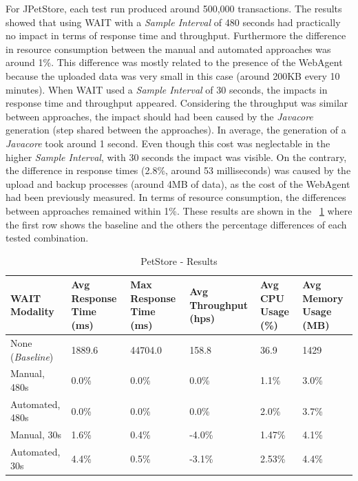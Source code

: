 \documentclass[runningheads,a4paper]{llncs}
\begin{document}
For JPetStore, each test run produced around 500,000 transactions. The
results showed that using WAIT with a \emph{Sample Interval} of 480 seconds had
practically no impact in terms of response time and throughput. Furthermore the
difference in resource consumption between the manual and automated approaches
was around 1\%.  This difference was mostly related to the presence of the
WebAgent because the uploaded data was very small in this case (around 200KB
every 10 minutes). When WAIT used a \emph{Sample Interval} of 30 seconds, the
impacts in response time and throughput appeared. Considering the throughput was
similar between approaches, the impact should had been caused by the
\emph{Javacore} generation (step shared between the approaches). In average, the
generation of a \emph{Javacore} took around 1 second. Even though this cost was
neglectable in the higher \emph{Sample Interval}, with 30 seconds the impact was
visible. On the contrary, the difference in response times (2.8\%, around 53
milliseconds) was caused by the upload and backup processes (around 4MB of
data), as the cost of the WebAgent had been previously measured. In terms of
resource consumption, the differences between approaches remained within 1\%.
These results are shown in the \tablename ~\ref{PetStore1} where the first row
shows the baseline and the others the percentage differences of each
tested combination.

\begin{table}[!h]
\caption{PetStore - Results}
\label{PetStore1}
\centering
\begin{tabular}{p{}|p{}|p{}|p{}|p{}|p{}}
\hline
\bfseries WAIT Modality & \bfseries Avg Response Time (ms)& \bfseries Max
Response Time (ms)& \bfseries Avg Throughput (hps)& \bfseries Avg CPU Usage
(\%) & \bfseries Avg Memory Usage (MB)\\
\hline
None (\emph{Baseline}) 	& 1889.6	& 44704.0	& 158.8 	& 36.9 		& 1429\\
Manual, 480s 			& 0.0\% 	& 0.0\%		& 0.0\%		& 1.1\% 	& 3.0\%\\
Automated, 480s 		& 0.0\%		& 0.0\%		& 0.0\% 	& 2.0\% 	& 3.7\%\\
Manual, 30s 			& 1.6\%		& 0.4\%		& -4.0\% 	& 1.47\% 	& 4.1\%\\
Automated, 30s 			& 4.4\%		& 0.5\%		& -3.1\% 	& 2.53\% 	& 4.4\%\\
\hline
\end{tabular}
\end{table}
\end{document}
